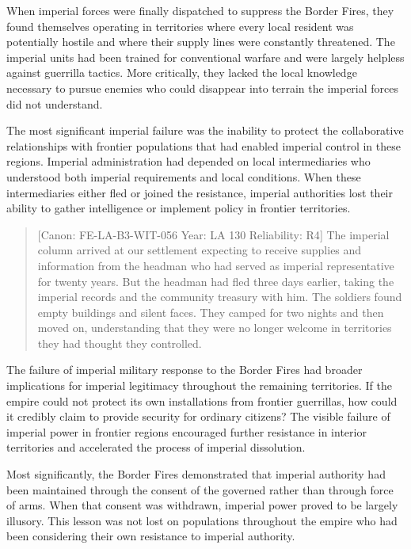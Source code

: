 When imperial forces were finally dispatched to suppress the Border
Fires, they found themselves operating in territories where every local
resident was potentially hostile and where their supply lines were
constantly threatened. The imperial units had been trained for
conventional warfare and were largely helpless against guerrilla
tactics. More critically, they lacked the local knowledge necessary to
pursue enemies who could disappear into terrain the imperial forces did
not understand.

The most significant imperial failure was the inability to protect the
collaborative relationships with frontier populations that had enabled
imperial control in these regions. Imperial administration had depended
on local intermediaries who understood both imperial requirements and
local conditions. When these intermediaries either fled or joined the
resistance, imperial authorities lost their ability to gather
intelligence or implement policy in frontier territories.

\begin{quote}
{[}Canon: FE-LA-B3-WIT-056 \textbar{} Year: LA 130 \textbar{}
Reliability: R4{]} The imperial column arrived at our settlement
expecting to receive supplies and information from the headman who had
served as imperial representative for twenty years. But the headman had
fled three days earlier, taking the imperial records and the community
treasury with him. The soldiers found empty buildings and silent faces.
They camped for two nights and then moved on, understanding that they
were no longer welcome in territories they had thought they controlled.
\end{quote}

The failure of imperial military response to the Border Fires had
broader implications for imperial legitimacy throughout the remaining
territories. If the empire could not protect its own installations from
frontier guerrillas, how could it credibly claim to provide security for
ordinary citizens? The visible failure of imperial power in frontier
regions encouraged further resistance in interior territories and
accelerated the process of imperial dissolution.

Most significantly, the Border Fires demonstrated that imperial
authority had been maintained through the consent of the governed rather
than through force of arms. When that consent was withdrawn, imperial
power proved to be largely illusory. This lesson was not lost on
populations throughout the empire who had been considering their own
resistance to imperial authority.


